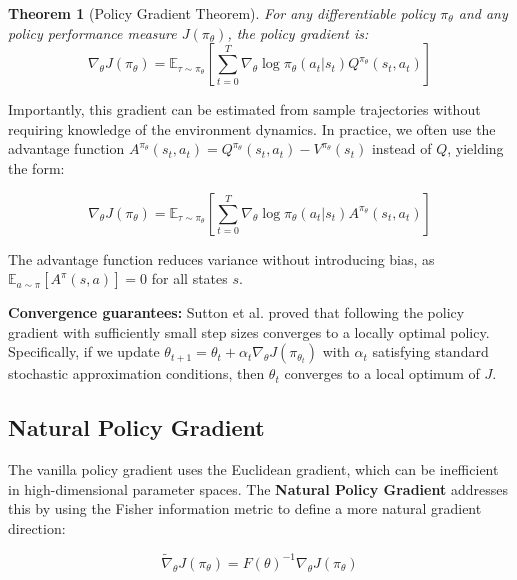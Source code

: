 \documentclass[12pt,a4paper]{report}
\newtheorem{theorem}{Theorem}[chapter]
\begin{document}
\begin{theorem}[Policy Gradient Theorem]
For any differentiable policy $\pi_\theta$ and any policy performance measure $J(\pi_\theta)$, the policy gradient is:
\begin{equation}
\nabla_\theta J(\pi_\theta) = \mathbb{E}_{\tau \sim \pi_\theta} \left[ \sum_{t=0}^{T} \nabla_\theta \log \pi_\theta(a_t|s_t) Q^{\pi_\theta}(s_t, a_t) \right]
\end{equation}
\end{theorem}

Importantly, this gradient can be estimated from sample trajectories without requiring knowledge of the environment dynamics. In practice, we often use the advantage function $A^{\pi_\theta}(s_t, a_t) = Q^{\pi_\theta}(s_t, a_t) - V^{\pi_\theta}(s_t)$ instead of $Q$, yielding the form:

\begin{equation}
\nabla_\theta J(\pi_\theta) = \mathbb{E}_{\tau \sim \pi_\theta} \left[ \sum_{t=0}^{T} \nabla_\theta \log \pi_\theta(a_t|s_t) A^{\pi_\theta}(s_t, a_t) \right]
\end{equation}

The advantage function reduces variance without introducing bias, as $\mathbb{E}_{a \sim \pi}[A^\pi(s,a)] = 0$ for all states $s$.

\textbf{Convergence guarantees:} Sutton et al. \cite{sutton1999policy} proved that following the policy gradient with sufficiently small step sizes converges to a locally optimal policy. Specifically, if we update $\theta_{t+1} = \theta_t + \alpha_t \nabla_\theta J(\pi_{\theta_t})$ with $\alpha_t$ satisfying standard stochastic approximation conditions, then $\theta_t$ converges to a local optimum of $J$.

\subsection{Natural Policy Gradient}

The vanilla policy gradient uses the Euclidean gradient, which can be inefficient in high-dimensional parameter spaces. The \textbf{Natural Policy Gradient} \cite{kakade2001natural} addresses this by using the Fisher information metric to define a more natural gradient direction:

\begin{equation}
\tilde{\nabla}_\theta J(\pi_\theta) = F(\theta)^{-1} \nabla_\theta J(\pi_\theta)
\end{equation}
\end{document}
